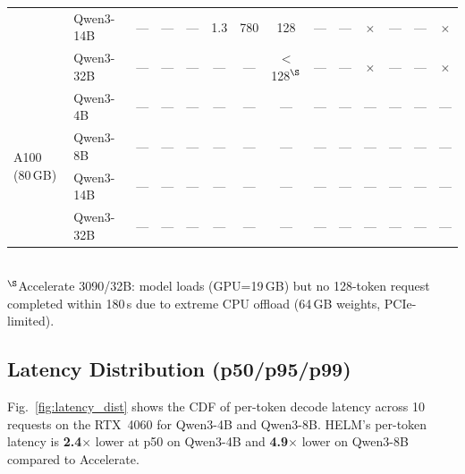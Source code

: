 \documentclass[lettersize,journal]{IEEEtran}
\begin{document}
\begin{table}[!t]
\begin{tabular}{llcccccccccccc}
& Qwen3-14B     & ---            & ---            & ---            & 1.3            & 780            & 128            & ---            & ---            & $\times$       & ---            & ---            & $\times$       \\
& Qwen3-32B     & ---            & ---            & ---            & ---            & ---            & $<$128$^\S$    & ---            & ---            & $\times$       & ---            & ---            & $\times$       \\
\midrule
\multirow{4}{*}{A100 (80\,GB)}
& Qwen3-4B      & ---            & ---            & ---            & ---            & ---            & ---            & ---            & ---            & ---            & ---            & ---            & ---            \\
& Qwen3-8B      & ---            & ---            & ---            & ---            & ---            & ---            & ---            & ---            & ---            & ---            & ---            & ---            \\
& Qwen3-14B     & ---            & ---            & ---            & ---            & ---            & ---            & ---            & ---            & ---            & ---            & ---            & ---            \\
& Qwen3-32B     & ---            & ---            & ---            & ---            & ---            & ---            & ---            & ---            & ---            & ---            & ---            & ---            \\
\bottomrule
\end{tabular}
\vspace{2pt}\\
\footnotesize{$^\S$Accelerate 3090/32B: model loads (GPU=19\,GB) but no 128-token request completed within 180\,s due to extreme CPU offload (64\,GB weights, PCIe-limited).}
\end{table}

\subsection{Latency Distribution (p50/p95/p99)}
\label{sec:latency_dist}

Fig.~\ref{fig:latency_dist} shows the CDF of per-token decode latency across
10 requests on the RTX~4060 for Qwen3-4B and Qwen3-8B.
HELM's per-token latency is \textbf{2.4$\times$} lower at p50 on Qwen3-4B
and \textbf{4.9$\times$} lower on Qwen3-8B compared to Accelerate.
\end{document}
